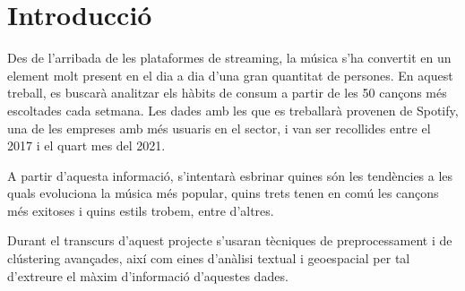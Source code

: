 \section{Introducció}

Des de l'arribada de les plataformes de streaming, la música s'ha convertit en un element molt present en el dia a dia d'una gran quantitat de persones. En aquest treball, es buscarà analitzar els hàbits de consum a partir de les 50 cançons més escoltades cada setmana.
Les dades amb les que es treballarà provenen de Spotify, una de les empreses amb més usuaris en el sector, i van ser recollides entre el 2017 i el quart mes del 2021.

A partir d'aquesta informació, s'intentarà esbrinar quines són les tendències a les quals evoluciona la música més popular, quins trets tenen en comú les cançons més exitoses i quins estils trobem, entre d'altres.

Durant el transcurs d'aquest projecte s'usaran tècniques de preprocessament i de clústering avançades, així com eines d'anàlisi textual i geoespacial per tal d'extreure el màxim d'informació d'aquestes dades.
